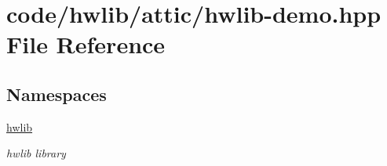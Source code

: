 \hypertarget{hwlib-demo_8hpp}{}\section{code/hwlib/attic/hwlib-\/demo.hpp File Reference}
\label{hwlib-demo_8hpp}
\subsection*{Namespaces}
\begin{DoxyCompactItemize}
\item 
 \hyperlink{namespacehwlib}{hwlib}
\begin{DoxyCompactList}\small\item\em hwlib library \end{DoxyCompactList}\end{DoxyCompactItemize}

